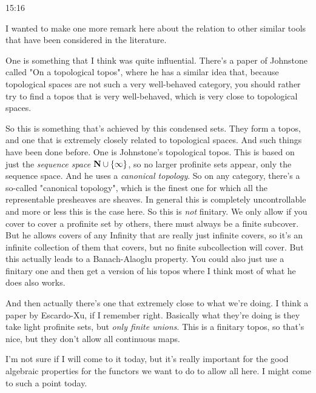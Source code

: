 \begin{unfinished}{15:16}
\begin{example}
\begin{remark}
\begin{remark}
I wanted to make one more remark here about the relation to other similar tools that have been considered in the literature.

One is something that I think was quite influential. There's a paper of Johnstone called "On a topological topos", \citeme{} where he has a similar idea that, because topological spaces are not such a very well-behaved category, you should rather try to find a topos that is very well-behaved, which is very close to topological spaces.


So this is something that's achieved by this condensed sets. They form a topos, and one that is extremely closely related to topological spaces. And such things have been done before. One is Johnstone's topological topos. This is based on just the \emph{sequence space} $\mathbf N \cup \{\infty\}$, so no larger profinite sets appear, only the sequence space.
And he uses a \emph{canonical topology}. So on any category, there's a so-called "canonical topology", which is the finest one for which all the representable presheaves are sheaves. %
In general this is completely uncontrollable and more or less this is the case here. So this is \emph{not} finitary. We only allow if you cover to cover a  profinite set by others, there must always be a finite subcover. But he allows covers of any 
Infinity that are really just infinite covers, so it's an infinite collection of them that covers, but no finite subcollection will cover. But this actually leads to a Banach-Alaoglu property.
You could also just use a finitary one and then get a version of his topos where I think most of what he does also works. 

And then actually there's one that extremely close to what we're doing. I think a paper by Escardo-Xu, if I remember right. Basically what they're doing is they take light profinite sets, but \emph{only finite unions}. This is a finitary topos, so that's nice, but they don't allow all continuous maps.

I'm not sure if I will come to it today, but it's really important for the good algebraic properties for the functors we want to do to allow all here. I might come to such a point today.


\end{remark}
\end{remark}
\end{example}
\end{unfinished}
